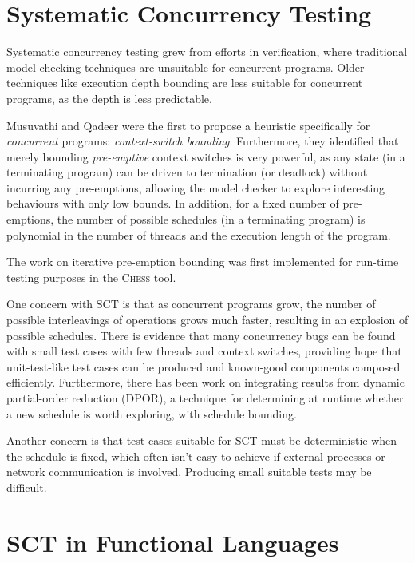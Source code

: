 \section{Systematic Concurrency Testing}
\label{sec:litrev-sct}

Systematic concurrency testing grew from efforts in
verification\cite{pbound}, where traditional model-checking techniques
are unsuitable for concurrent programs. Older techniques like
execution depth bounding are less suitable for concurrent programs, as
the depth is less predictable.

Musuvathi and Qadeer were the first to propose a heuristic
specifically for \textit{concurrent} programs: \textit{context-switch
  bounding}. Furthermore, they identified that merely bounding
\textit{pre-emptive} context switches is very powerful, as any state
(in a terminating program) can be driven to termination (or deadlock)
without incurring any pre-emptions, allowing the model checker to
explore interesting behaviours with only low bounds. In addition, for
a fixed number of pre-emptions, the number of possible schedules (in a
terminating program) is polynomial in the number of threads and the
execution length of the program.

The work on iterative pre-emption bounding was first implemented for
run-time testing purposes in the \textsc{Chess}\cite{heisenbugs} tool.

One concern with SCT is that as concurrent programs grow, the number
of possible interleavings of operations grows much faster, resulting
in an explosion of possible schedules. There is evidence that many
concurrency bugs can be found with small test cases with few threads
and context switches\cite{pbound, dbound, empirical}, providing hope
that unit-test-like test cases can be produced and known-good
components composed efficiently. Furthermore, there has been work on
integrating results from dynamic partial-order reduction (DPOR), a
technique for determining at runtime whether a new schedule is worth
exploring, with schedule bounding\cite{bpor}.

Another concern is that test cases suitable for SCT must be
deterministic when the schedule is fixed, which often isn't easy to
achieve if external processes or network communication is
involved. Producing small suitable tests may be difficult.

\section{SCT in Functional Languages}
\label{sec:litrev-sctfunc}

